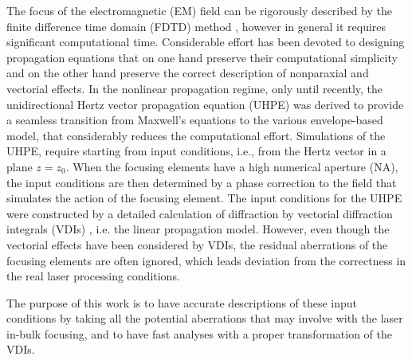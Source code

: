 \documentclass[9pt,twocolumn,twoside]{osajnl}
\begin{document}
The focus of the electromagnetic (EM) field can be rigorously described by the finite difference time domain (FDTD) method \cite{liu2000three}, however in general it requires significant computational time. Considerable effort has been devoted to designing propagation equations that on one hand preserve their computational simplicity and on the other hand preserve the correct description of nonparaxial and vectorial effects. In the nonlinear propagation regime, only until recently, the unidirectional Hertz vector propagation equation (UHPE) \cite{couairon2015propagation, PhysRevE.100.033316} was derived to provide a seamless transition from Maxwell’s equations to the various envelope-based model, that considerably reduces the computational effort. Simulations of the UHPE, require starting from input conditions, i.e., from the Hertz vector in a plane $z = z_0$. When the focusing elements have a high numerical aperture (NA), the input conditions are then determined by a phase correction to the field that simulates the action of the focusing element. The input conditions for the UHPE were constructed by a detailed calculation of diffraction by vectorial diffraction integrals (VDIs) \cite{varga2000focusing1,varga2000focusing2}, i.e. the linear propagation model. However, even though the vectorial effects have been considered by VDIs, the residual aberrations of the focusing elements are often ignored, which leads deviation from the correctness in the real laser processing conditions.

The purpose of this work is to have accurate descriptions of these input conditions by taking all the potential aberrations that may involve with the laser in-bulk focusing, and to have fast analyses with a proper transformation of the VDIs. 
\end{document}
